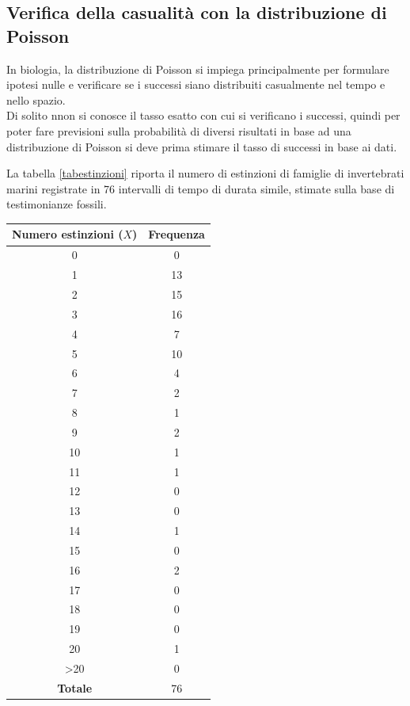\documentclass[10pt, draft]{book}
\newcounter{example}[section]
\begin{document}
\subsection{Verifica della casualità con la distribuzione di Poisson}
In biologia, la distribuzione di Poisson si impiega principalmente per formulare ipotesi nulle e verificare se i successi siano distribuiti casualmente nel tempo e nello spazio.
\\
Di solito nnon si conosce il tasso esatto con cui si verificano i successi, quindi per poter fare previsioni sulla probabilità di diversi risultati in base ad una distribuzione di Poisson si deve prima stimare il tasso di successi in base ai dati.
\begin{example}
La tabella \ref{tabestinzioni} riporta il numero di estinzioni di famiglie di invertebrati marini registrate in 76 intervalli di tempo di durata simile, stimate sulla base di testimonianze fossili.
\begin{table}[H]
        \centering
        \renewcommand\arraystretch{1.2}
        \begin{tabular}{c|c}
        \hline
        \textbf{Numero estinzioni ($X$)} & \textbf{Frequenza}\\
        \hline
        0 & 0 \\
        1 & 13 \\
        2 & 15 \\
        3 & 16 \\
        4 & 7 \\
        5 & 10 \\
        6 & 4 \\
        7 & 2 \\
        8 & 1 \\
        9 & 2 \\
        10 & 1 \\
        11 & 1 \\
        12 & 0 \\
        13 & 0 \\
        14 & 1 \\
        15 & 0 \\
        16 & 2 \\
        17 & 0 \\
        18 & 0 \\
        19 & 0 \\
        20 & 1 \\
        >20 & 0 \\
        \hline
        \textbf{Totale} & 76 \\

\end{tabular}
\end{table}
\end{example}
\end{document}
